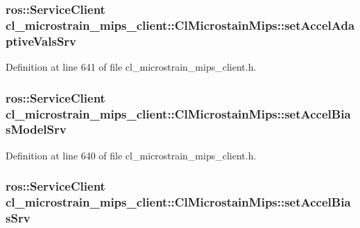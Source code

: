 \subsubsection[{\texorpdfstring{set\+Accel\+Adaptive\+Vals\+Srv}{setAccelAdaptiveValsSrv}}]{\setlength{\rightskip}{0pt plus 5cm}ros\+::\+Service\+Client cl\+\_\+microstrain\+\_\+mips\+\_\+client\+::\+Cl\+Microstain\+Mips\+::set\+Accel\+Adaptive\+Vals\+Srv\hspace{0.3cm}{\ttfamily [protected]}}\hypertarget{classcl__microstrain__mips__client_1_1ClMicrostainMips_a0c31de547137c43fb1f8325032effe28}{}\label{classcl__microstrain__mips__client_1_1ClMicrostainMips_a0c31de547137c43fb1f8325032effe28}


Definition at line 641 of file cl\+\_\+microstrain\+\_\+mips\+\_\+client.\+h.

\subsubsection[{\texorpdfstring{set\+Accel\+Bias\+Model\+Srv}{setAccelBiasModelSrv}}]{\setlength{\rightskip}{0pt plus 5cm}ros\+::\+Service\+Client cl\+\_\+microstrain\+\_\+mips\+\_\+client\+::\+Cl\+Microstain\+Mips\+::set\+Accel\+Bias\+Model\+Srv\hspace{0.3cm}{\ttfamily [protected]}}\hypertarget{classcl__microstrain__mips__client_1_1ClMicrostainMips_a3c834f448cc214e1f23a8ea5ef677753}{}\label{classcl__microstrain__mips__client_1_1ClMicrostainMips_a3c834f448cc214e1f23a8ea5ef677753}


Definition at line 640 of file cl\+\_\+microstrain\+\_\+mips\+\_\+client.\+h.

\subsubsection[{\texorpdfstring{set\+Accel\+Bias\+Srv}{setAccelBiasSrv}}]{\setlength{\rightskip}{0pt plus 5cm}ros\+::\+Service\+Client cl\+\_\+microstrain\+\_\+mips\+\_\+client\+::\+Cl\+Microstain\+Mips\+::set\+Accel\+Bias\+Srv\hspace{0.3cm}{\ttfamily [protected]}}\hypertarget{classcl__microstrain__mips__client_1_1ClMicrostainMips_a236933f60d57e7ae1dcbea487948b929}{}\label{classcl__microstrain__mips__client_1_1ClMicrostainMips_a236933f60d57e7ae1dcbea487948b929}


